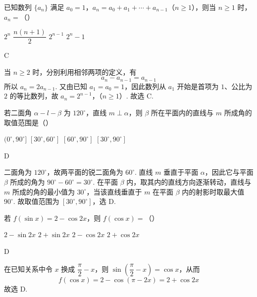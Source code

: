 \begin{problem}
已知数列 \(\{a_n\}\) 满足 \(a_0=1\)，\(a_n=a_0+a_1+\cdots+a_{n-1}\)（\(n\geqslant1\)），则当 \(n\geqslant1\) 时，\(a_n=\)（\quad）

\choices
    {\(2^n\)}
    {\(\dfrac{n(n+1)}2\)}
    {\(2^{n-1}\)}
    {\(2^n-1\)}
\end{problem}

\begin{answer}
C
\end{answer}

\begin{solution}
当 \(n\geqslant2\) 时，分别利用相邻两项的定义，有
\[
a_n-a_{n-1}=a_{n-1}
\]
所以 \(a_n=2a_{n-1}\). 又由已知 \(a_1=a_0=1\)，因此数列从 \(a_1\) 开始是首项为 \(1\)、公比为 \(2\) 的等比数列，故
\(a_n=2^{n-1}\)，（\(n\geqslant1\)）.
故选 C.
\end{solution}

\begin{problem}
若二面角 \(\alpha-l-\beta\) 为 \(120^\circ\)，直线 \(m\perp\alpha\)，则 \(\beta\) 所在平面内的直线与 \(m\) 所成角的取值范围是（\quad）

\choices
    {\((0^\circ,90^\circ]\)}
    {\([30^\circ,60^\circ]\)}
    {\([60^\circ,90^\circ]\)}
    {\([30^\circ,90^\circ]\)}
\end{problem}

\begin{answer}
D
\end{answer}

\begin{solution}
二面角为 \(120^\circ\)，故两平面的锐二面角为 \(60^\circ\). 直线 \(m\) 垂直于平面 \(\alpha\)，因此它与平面 \(\beta\) 所成的角为 \(90^\circ-60^\circ=30^\circ\). 在平面 \(\beta\) 内，取其内的直线方向逐渐转动，直线与 \(m\) 所成的角的最小值为 \(30^\circ\)，当该直线垂直于 \(m\) 在平面 \(\beta\) 内的射影时取最大值 \(90^\circ\). 故取值范围为 \([30^\circ,90^\circ]\)，选 D.
\end{solution}

\begin{problem}
若 \(f(\sin x)=2-\cos2x\)，则 \(f(\cos x)=\)（\quad）

\choices
    {\(2-\sin2x\)}
    {\(2+\sin2x\)}
    {\(2-\cos2x\)}
    {\(2+\cos2x\)}
\end{problem}

\begin{answer}
D
\end{answer}

\begin{solution}
在已知关系中令 \(x\) 换成 \(\dfrac\pi2-x\)，则 \(\sin\left(\dfrac\pi2-x\right)=\cos x\)，从而
\[
f(\cos x)=2-\cos\left(\pi-2x\right)=2+\cos2x
\]
故选 D.
\end{solution}


